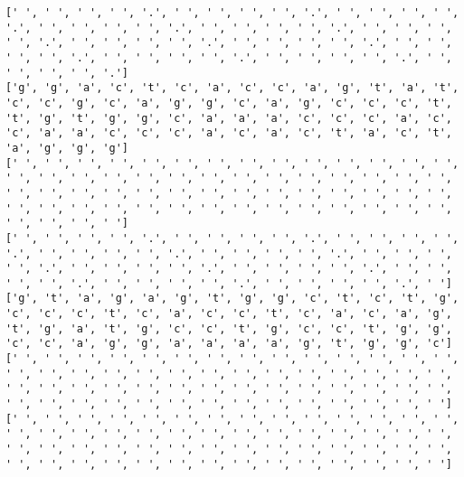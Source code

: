 \documentclass{article}
\begin{document}
\begin{Verbatim}
[' ', ' ', ' ', ' ', '.', ' ', ' ', ' ', ' ', '.', ' ', ' ', ' ', ' ', '.', ' ', ' ', ' ', ' ', '.', ' ', ' ', ' ', ' ', '.', ' ', ' ', ' ', ' ', '.', ' ', ' ', ' ', ' ', '.', ' ', ' ', ' ', ' ', '.', ' ', ' ', ' ', ' ', '.', ' ', ' ', ' ', ' ', '.', ' ', ' ', ' ', ' ', '.', ' ', ' ', ' ', ' ', '.']
['g', 'g', 'a', 'c', 't', 'c', 'a', 'c', 'c', 'a', 'g', 't', 'a', 't', 'c', 'c', 'g', 'c', 'a', 'g', 'g', 'c', 'a', 'g', 'c', 'c', 'c', 't', 't', 'g', 't', 'g', 'g', 'c', 'a', 'a', 'a', 'c', 'c', 'c', 'a', 'c', 'c', 'a', 'a', 'c', 'c', 'c', 'a', 'c', 'a', 'c', 't', 'a', 'c', 't', 'a', 'g', 'g', 'g']
[' ', ' ', ' ', ' ', ' ', ' ', ' ', ' ', ' ', ' ', ' ', ' ', ' ', ' ', ' ', ' ', ' ', ' ', ' ', ' ', ' ', ' ', ' ', ' ', ' ', ' ', ' ', ' ', ' ', ' ', ' ', ' ', ' ', ' ', ' ', ' ', ' ', ' ', ' ', ' ', ' ', ' ', ' ', ' ', ' ', ' ', ' ', ' ', ' ', ' ', ' ', ' ', ' ', ' ', ' ', ' ', ' ', ' ', ' ', ' ']
[' ', ' ', ' ', ' ', '.', ' ', ' ', ' ', ' ', '.', ' ', ' ', ' ', ' ', '.', ' ', ' ', ' ', ' ', '.', ' ', ' ', ' ', ' ', '.', ' ', ' ', ' ', ' ', '.', ' ', ' ', ' ', ' ', '.', ' ', ' ', ' ', ' ', '.', ' ', ' ', ' ', ' ', '.', ' ', ' ', ' ', ' ', '.', ' ', ' ', ' ', ' ', '.', ' ']
['g', 't', 'a', 'g', 'a', 'g', 't', 'g', 'g', 'c', 't', 'c', 't', 'g', 'c', 'c', 'c', 't', 'c', 'a', 'c', 'c', 't', 'c', 'a', 'c', 'a', 'g', 't', 'g', 'a', 't', 'g', 'c', 'c', 't', 'g', 'c', 'c', 't', 'g', 'g', 'c', 'c', 'a', 'g', 'g', 'a', 'a', 'a', 'a', 'g', 't', 'g', 'g', 'c']
[' ', ' ', ' ', ' ', ' ', ' ', ' ', ' ', ' ', ' ', ' ', ' ', ' ', ' ', ' ', ' ', ' ', ' ', ' ', ' ', ' ', ' ', ' ', ' ', ' ', ' ', ' ', ' ', ' ', ' ', ' ', ' ', ' ', ' ', ' ', ' ', ' ', ' ', ' ', ' ', ' ', ' ', ' ', ' ', ' ', ' ', ' ', ' ', ' ', ' ', ' ', ' ', ' ', ' ', ' ', ' ']
[' ', ' ', ' ', ' ', ' ', ' ', ' ', ' ', ' ', ' ', ' ', ' ', ' ', ' ', ' ', ' ', ' ', ' ', ' ', ' ', ' ', ' ', ' ', ' ', ' ', ' ', ' ', ' ', ' ', ' ', ' ', ' ', ' ', ' ', ' ', ' ', ' ', ' ', ' ', ' ', ' ', ' ', ' ', ' ', ' ', ' ', ' ', ' ', ' ', ' ', ' ', ' ', ' ', ' ', ' ', ' ']
 

\end{Verbatim}
\end{document}
